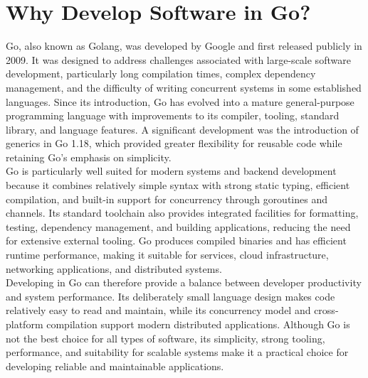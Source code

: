 \section{Why Develop Software in Go?}
Go, also known as Golang, was developed by Google and first released publicly in 2009. It was designed to address challenges associated with large-scale software development, particularly long compilation times, complex dependency management, and the difficulty of writing concurrent systems in some established languages. Since its introduction, Go has evolved into a mature general-purpose programming language with improvements to its compiler, tooling, standard library, and language features. A significant development was the introduction of generics in Go 1.18, which provided greater flexibility for reusable code while retaining Go's emphasis on simplicity.\\

Go is particularly well suited for modern systems and backend development because it combines relatively simple syntax with strong static typing, efficient compilation, and built-in support for concurrency through goroutines and channels. Its standard toolchain also provides integrated facilities for formatting, testing, dependency management, and building applications, reducing the need for extensive external tooling. Go produces compiled binaries and has efficient runtime performance, making it suitable for services, cloud infrastructure, networking applications, and distributed systems.\\

Developing in Go can therefore provide a balance between developer productivity and system performance. Its deliberately small language design makes code relatively easy to read and maintain, while its concurrency model and cross-platform compilation support modern distributed applications. Although Go is not the best choice for all types of software, its simplicity, strong tooling, performance, and suitability for scalable systems make it a practical choice for developing reliable and maintainable applications.